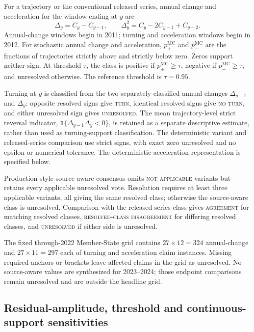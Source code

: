 For a trajectory or the conventional released series, annual change and acceleration for the window ending at $y$ are
\begin{equation}
\Delta_y=C_y-C_{y-1},\qquad
\Delta^2_y=C_y-2C_{y-1}+C_{y-2}.
\end{equation}
Annual-change windows begin in 2011; turning and acceleration windows begin in 2012. For stochastic annual change and acceleration, $p_+^{\mathrm{MC}}$ and $p_-^{\mathrm{MC}}$ are the fractions of trajectories strictly above and strictly below zero. Zeros support neither sign. At threshold $\tau$, the class is positive if $p_+^{\mathrm{MC}}\geq\tau$, negative if $p_-^{\mathrm{MC}}\geq\tau$, and unresolved otherwise. The reference threshold is $\tau=0.95$.

Turning at $y$ is classified from the two separately classified annual changes $\Delta_{y-1}$ and $\Delta_y$: opposite resolved signs give \textsc{turn}, identical resolved signs give \textsc{no turn}, and either unresolved sign gives \textsc{unresolved}. The mean trajectory-level strict reversal indicator, $\mathbf{1}\{\Delta_{y-1}\Delta_y<0\}$, is retained as a separate descriptive estimate, rather than used as turning-support classification. The deterministic variant and released-series comparison use strict signs, with exact zero unresolved and no epsilon or numerical tolerance. The deterministic acceleration representation is specified below.

Production-style source-aware consensus omits \textsc{not applicable} variants but retains every applicable unresolved vote. Resolution requires at least three applicable variants, all giving the same resolved class; otherwise the source-aware class is unresolved. Comparison with the released-series class gives \textsc{agreement} for matching resolved classes, \textsc{resolved-class disagreement} for differing resolved classes, and \textsc{unresolved} if either side is unresolved.

The fixed through-2022 Member-State grid contains $27\times12=324$ annual-change and $27\times11=297$ each of turning and acceleration claim instances. Missing required anchors or brackets leave affected claims in the grid as unresolved. No source-aware values are synthesized for 2023--2024; those endpoint comparisons remain unresolved and are outside the headline grid.

\subsection{Residual-amplitude, threshold and continuous-support sensitivities}


